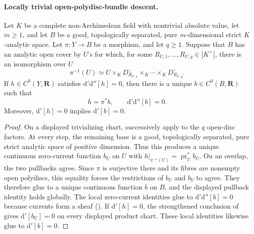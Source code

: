 \paragraph{Locally trivial open-polydisc-bundle descent.}
\begin{proposition}
\label{prop:p062-open-disc-bundle-descent}
\label{prop:p062-open-polydisc-bundle-descent}
Let \(K\) be a complete non-Archimedean field with nontrivial absolute
value, let \(m\geq1\), and let \(B\) be a good, topologically separated,
pure \(m\)-dimensional strict \(K\)-analytic space.  Let
\(\pi:Y\to B\) be a morphism, and let \(q\geq1\).  Suppose that \(B\)
has an analytic open cover by \(U\)'s for which, for some
\(R_{U,1},\ldots,R_{U,q}\in|K^\times|\), there is an isomorphism over
\(U\)
\[
              \pi^{-1}(U)\simeq
              U\times_KD_{R_{U,1}}^-\times_K\cdots\times_KD_{R_{U,q}}^-.
\]
If \(h\in C^0(Y,\mathbf R)\) satisfies
\(\mathrm d'\mathrm d''[h]=0\), then there is a unique
\(b\in C^0(B,\mathbf R)\) such that
\[
                         h=\pi^*b,
                         \qquad
                         \mathrm d'\mathrm d''[b]=0.
\]
Moreover, \(\mathrm d'[h]=0\) implies \(\mathrm d'[b]=0\).
\end{proposition}

\begin{proof}
On a displayed trivializing chart, successively apply
 to the \(q\) open-disc factors.  At every
step, the remaining base is a good, topologically separated, pure strict
analytic space of positive dimension.  Thus this produces a unique
continuous zero-current function \(b_U\) on \(U\) with
\(h|_{\pi^{-1}(U)}=\operatorname{pr}_U^*b_U\).  On an overlap, the two
pullbacks agree.  Since \(\pi\) is surjective there and its fibres are
nonempty open polydiscs, this equality forces the restrictions of \(b_U\)
and \(b_V\) to agree.  They therefore glue to a unique continuous function
\(b\) on \(B\), and the displayed pullback identity holds globally.  The
local zero-current identities glue to \(\mathrm d'\mathrm d''[b]=0\)
because currents form a sheaf ().
If \(\mathrm d'[h]=0\), the strengthened conclusion of
 gives \(\mathrm d'[b_U]=0\) on every
displayed product chart.  These local identities likewise glue to
\(\mathrm d'[b]=0\).
\end{proof}


